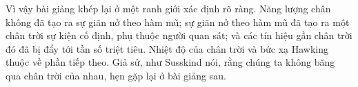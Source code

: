 \begin{classroomqa}
\end{classroomqa}

Vì vậy bài giảng khép lại ở một ranh giới xác định rõ ràng. Năng lượng chân không đã tạo ra sự giãn nở theo hàm mũ; sự giãn nở theo hàm mũ đã tạo ra một chân trời sự kiện cố định, phụ thuộc người quan sát; và các tín hiệu gần chân trời đó đã bị đẩy tới tần số triệt tiêu. Nhiệt độ của chân trời và bức xạ Hawking thuộc về phần tiếp theo. Giả sử, như Susskind nói, rằng chúng ta không băng qua chân trời của nhau, hẹn gặp lại ở bài giảng sau.
